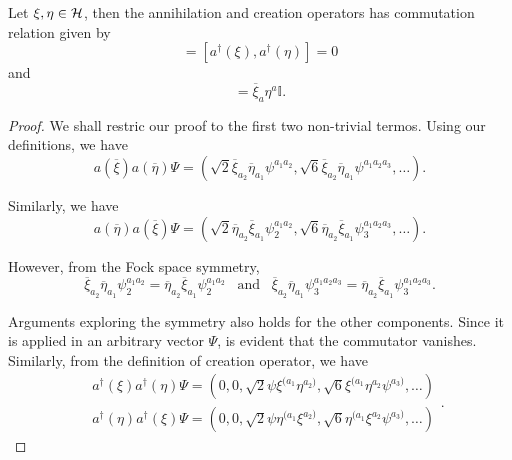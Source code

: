 \begin{proposition}\label{prop:ccr}
    Let \(\xi,\eta\in{\mathcal{H}}\), then the annihilation and creation operators has commutation relation given by
    \begin{equation}
        [a(\overline{\xi}),a(\overline{\eta})]=[a^{\dagger}(\xi),a^{\dagger}(\eta)]=0
    \end{equation}
    and
    \begin{equation}
        [a(\overline{\xi}),a^{\dagger}(\eta)]=\overline{\xi}_a\eta^a\mathbb{I}.
    \end{equation}
\end{proposition}
\begin{proof}
    We shall restric our proof to the first two non-trivial termos. Using our definitions, we have
    \begin{equation}
        a(\overline{\xi})a(\overline{\eta})\Psi=\left(\sqrt{2}\overline{\xi}_{a_2}\overline{\eta}_{a_1}\psi^{a_1a_2},\sqrt{6}\overline{\xi}_{a_2}\overline{\eta}_{a_1}\psi^{a_1a_2a_3},\dots\right).
    \end{equation}

    Similarly, we have
    \begin{equation}
        a(\overline{\eta})a(\overline{\xi})\Psi=\left(\sqrt{2}\overline{\eta}_{a_2}\overline{\xi}_{a_1}\psi_2^{a_1a_2},\sqrt{6}\overline{\eta}_{a_2}\overline{\xi}_{a_1}\psi_3^{a_1a_2a_3},\dots\right).
    \end{equation}

    However, from the Fock space symmetry,
    \begin{equation}
        \overline{\xi}_{a_2}\overline{\eta}_{a_1}\psi_2^{a_1a_2}=\overline{\eta}_{a_2}\overline{\xi}_{a_1}\psi_2^{a_1a_2}\;\;\;\text{and}\;\;\;\overline{\xi}_{a_2}\overline{\eta}_{a_1}\psi_3^{a_1a_2a_3}=\overline{\eta}_{a_2}\overline{\xi}_{a_1}\psi_3^{a_1a_2a_3}.
    \end{equation}

    Arguments exploring the symmetry also holds for the other components. Since it is applied in an arbitrary vector \(\Psi\), is evident that the commutator vanishes. 
    Similarly, from the definition of creation operator, we have
    \begin{equation}
        \begin{aligned}
            &a^{\dagger}(\xi)a^{\dagger}(\eta)\Psi=\left(0,0,\sqrt{2}\psi\xi^{(a_1}\eta^{a_2)},\sqrt{6}\xi^{(a_1}\eta^{a_2}\psi^{a_3)},\dots\right)\\
            &a^{\dagger}(\eta)a^{\dagger}(\xi)\Psi=\left(0,0,\sqrt{2}\psi\eta^{(a_1}\xi^{a_2)},\sqrt{6}\eta^{(a_1}\xi^{a_2}\psi^{a_3)},\dots\right)
        \end{aligned}.
    \end{equation}


\end{proof}
